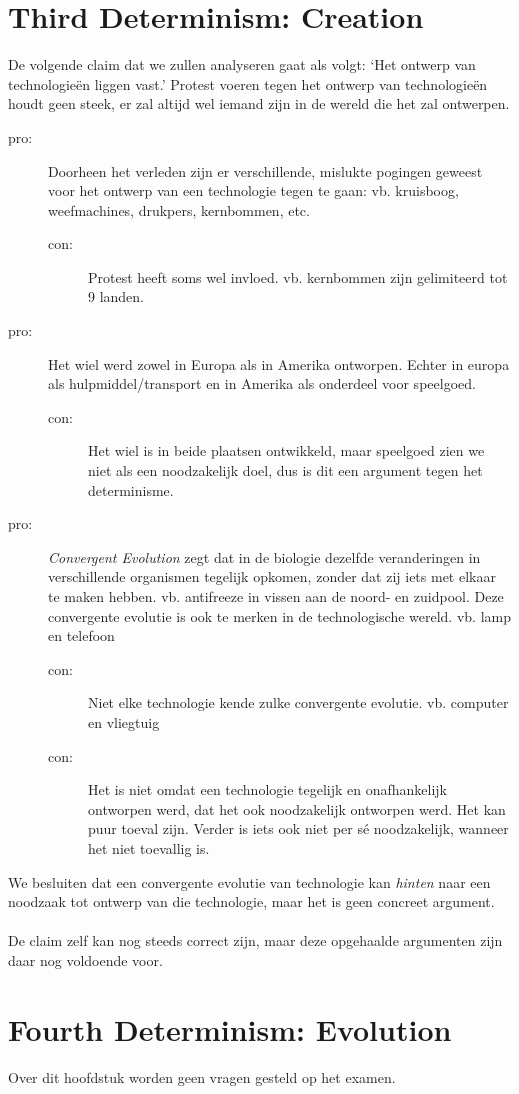 \documentclass[../summary.tex]{subfiles}
\begin{document}
	\section{Third Determinism: Creation}
	De volgende claim dat we zullen analyseren gaat als volgt: `Het ontwerp van technologieën liggen vast.' Protest voeren tegen het ontwerp van technologieën houdt geen steek, er zal altijd wel iemand zijn in de wereld die het zal ontwerpen.
	\begin{description}
		\item[pro:] Doorheen het verleden zijn er verschillende, mislukte pogingen geweest voor het ontwerp van een technologie tegen te gaan: vb. kruisboog, weefmachines, drukpers, kernbommen, etc.
		\begin{description}
			\item[con:] Protest heeft soms wel invloed. vb. kernbommen zijn gelimiteerd tot 9 landen.
		\end{description}
		\item[pro:] Het wiel werd zowel in Europa als in Amerika ontworpen. Echter in europa als hulpmiddel/transport en in Amerika als onderdeel voor speelgoed.
		\begin{description}
			\item[con:] Het wiel is in beide plaatsen ontwikkeld, maar speelgoed zien we niet als een noodzakelijk doel, dus is dit een argument tegen het determinisme. 
		\end{description}
		\item[pro:] \emph{Convergent Evolution} zegt dat in de biologie dezelfde veranderingen in verschillende organismen tegelijk opkomen, zonder dat zij iets met elkaar te maken hebben. vb. antifreeze in vissen aan de noord- en zuidpool. Deze convergente evolutie is ook te merken in de technologische wereld. vb. lamp en telefoon
		\begin{description}
			\item[con:] Niet elke technologie kende zulke convergente evolutie. vb. computer en vliegtuig
			\item[con:] Het is niet omdat een technologie tegelijk en onafhankelijk ontworpen werd, dat het ook noodzakelijk ontworpen werd. Het kan puur toeval zijn. Verder is iets ook niet per sé noodzakelijk, wanneer het niet toevallig is.
		\end{description}
	\end{description}
	We besluiten dat een convergente evolutie van technologie kan \emph{hinten} naar een noodzaak tot ontwerp van die technologie, maar het is geen concreet argument.\\
	\\
	De claim zelf kan nog steeds correct zijn, maar deze opgehaalde argumenten zijn daar nog voldoende voor.
	
	\section{Fourth Determinism: Evolution}
	Over dit hoofdstuk worden geen vragen gesteld op het examen.
		
\end{document}

